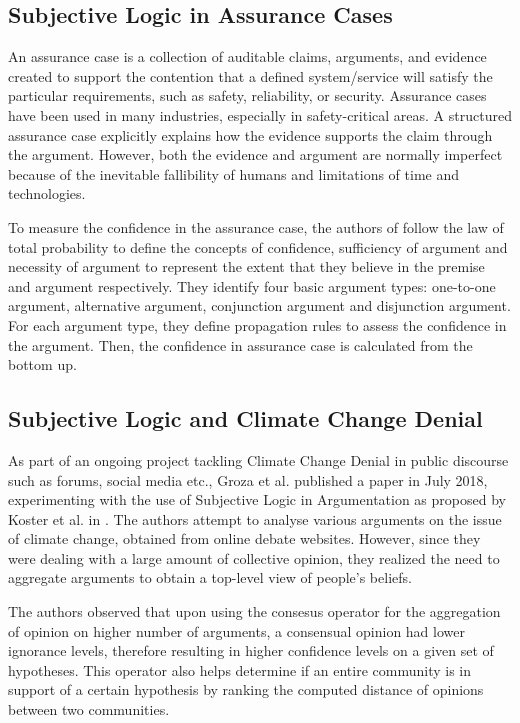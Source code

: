 \documentclass[sigconf]{acmart}
\begin{document}
\subsection{Subjective Logic in Assurance Cases}
An assurance case is a collection of auditable claims, arguments, and evidence created to support the contention that a defined system/service will satisfy the particular requirements, such as safety, reliability, or
security. Assurance cases have been used in many industries, especially in safety-critical areas. A structured assurance case
explicitly explains how the evidence supports the claim through the argument. However, both the evidence and argument are
normally imperfect because of the inevitable fallibility of humans and limitations of time and technologies.\cite{yuan2017subjective}

To measure the confidence in the assurance case, the authors of \cite{yuan2017subjective}
follow the law of total probability to define the concepts of confidence, sufficiency of argument and necessity of argument to represent the extent that they believe in the premise and argument respectively. They identify four basic argument types: one-to-one argument, alternative argument, conjunction argument and disjunction argument. For each
argument type, they define propagation rules to assess the confidence in the argument. Then, the confidence in assurance case is calculated from the bottom up.

\subsection{Subjective Logic and Climate Change Denial}
As part of an ongoing project tackling Climate Change Denial in public discourse such as forums, social media etc., Groza et al. published a paper in July 2018, experimenting with the use of Subjective Logic in Argumentation as proposed by Koster et al. in \cite{Koster2017}. The authors attempt to analyse various arguments on the issue of climate change, obtained from online debate websites. However, since they were dealing with a large amount of collective opinion, they realized the need to aggregate arguments to obtain a top-level view of people's beliefs. 

The authors observed that upon using the consesus operator for the aggregation of opinion on higher number of arguments, a consensual opinion had 
lower ignorance levels, therefore resulting in higher confidence levels on a given set of hypotheses. This operator also helps determine if 
an entire community is in support of a certain hypothesis by ranking the computed distance of opinions between two communities.
\end{document}
